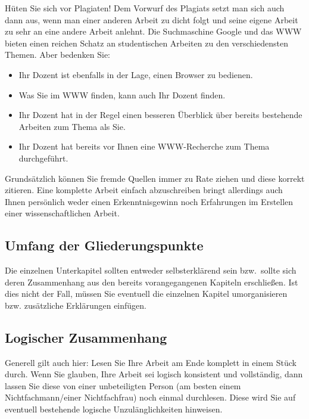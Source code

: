 Hüten Sie sich vor Plagiaten!
Dem Vorwurf des Plagiats setzt man sich auch dann aus, wenn man einer anderen Arbeit zu dicht folgt und seine eigene Arbeit zu sehr an eine andere Arbeit anlehnt.
Die Suchmaschine Google und das WWW bieten einen reichen Schatz an studentischen Arbeiten zu den verschiedensten Themen.
Aber bedenken Sie:
\begin{itemize}
\item Ihr Dozent ist ebenfalls in der Lage, einen Browser zu bedienen.
\item Was Sie im WWW finden, kann auch Ihr Dozent finden.
\item Ihr Dozent hat in der Regel einen besseren Überblick über bereits bestehende Arbeiten zum Thema als Sie.
\item Ihr Dozent hat bereits vor Ihnen eine WWW-Recherche zum Thema durchgeführt.
\end{itemize}
Grundsätzlich können Sie fremde Quellen immer zu Rate ziehen und diese korrekt zitieren.
Eine komplette Arbeit einfach abzuschreiben bringt allerdings auch Ihnen persönlich weder einen Erkenntnisgewinn noch Erfahrungen im Erstellen einer wissenschaftlichen Arbeit.


\subsection{Umfang der Gliederungspunkte}
Die einzelnen Unterkapitel sollten entweder selbsterklärend sein bzw.~sollte sich deren Zusammenhang aus den bereits vorangegangenen Kapiteln erschließen.
Ist dies nicht der Fall, müssen Sie eventuell die einzelnen Kapitel umorganisieren bzw. zusätzliche Erklärungen einfügen.

\subsection{Logischer Zusammenhang}
Generell gilt auch hier: Lesen Sie Ihre Arbeit am Ende komplett in einem Stück durch.
Wenn Sie glauben, Ihre Arbeit sei logisch konsistent und vollständig, dann lassen Sie diese von einer unbeteiligten Person (am besten einem Nichtfachmann/einer Nichtfachfrau) noch einmal durchlesen.
Diese wird Sie auf eventuell bestehende logische Unzulänglichkeiten hinweisen.
